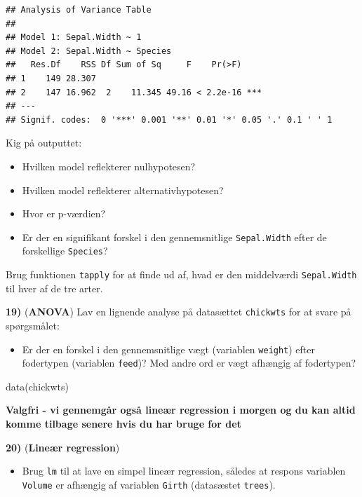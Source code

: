 \documentclass[
]{book}
\newenvironment{Shaded}{\begin{snugshade}}{\end{snugshade}}
\newcommand{\FunctionTok}[1]{\textcolor[rgb]{0.00,0.00,0.00}{#1}}
\newcommand{\NormalTok}[1]{#1}
\providecommand{\tightlist}{%
  \setlength{\itemsep}{0pt}\setlength{\parskip}{0pt}}
\begin{document}
\begin{verbatim}
## Analysis of Variance Table
## 
## Model 1: Sepal.Width ~ 1
## Model 2: Sepal.Width ~ Species
##   Res.Df    RSS Df Sum of Sq     F    Pr(>F)    
## 1    149 28.307                                 
## 2    147 16.962  2    11.345 49.16 < 2.2e-16 ***
## ---
## Signif. codes:  0 '***' 0.001 '**' 0.01 '*' 0.05 '.' 0.1 ' ' 1
\end{verbatim}

Kig på outputtet:

\begin{itemize}
\tightlist
\item
  Hvilken model reflekterer nulhypotesen?
\item
  Hvilken model reflekterer alternativhypotesen?
\item
  Hvor er p-værdien?
\item
  Er der en signifikant forskel i den gennemsnitlige \texttt{Sepal.Width} efter de forskellige \texttt{Species}?
\end{itemize}

Brug funktionen \texttt{tapply} for at finde ud af, hvad er den middelværdi \texttt{Sepal.Width} til hver af de tre arter.

\textbf{19)} (\textbf{ANOVA}) Lav en lignende analyse på datasættet \texttt{chickwts} for at svare på spørgsmålet:

\begin{itemize}
\tightlist
\item
  Er der en forskel i den gennemsnitlige vægt (variablen \texttt{weight}) efter fodertypen (variablen \texttt{feed})? Med andre ord er vægt afhængig af fodertypen?
\end{itemize}

\begin{Shaded}
\begin{Highlighting}[]
\FunctionTok{data}\NormalTok{(chickwts)}
\end{Highlighting}
\end{Shaded}

\textbf{Valgfri - vi gennemgår også lineær regression i morgen og du kan altid komme tilbage senere hvis du har bruge for det}

\textbf{20)} (\textbf{Lineær regression})

\begin{itemize}
\tightlist
\item
  Brug \texttt{lm} til at lave en simpel lineær regression, således at respons variablen \texttt{Volume} er afhængig af variablen \texttt{Girth} (datasæstet \texttt{trees}).
\end{itemize}
\end{document}
